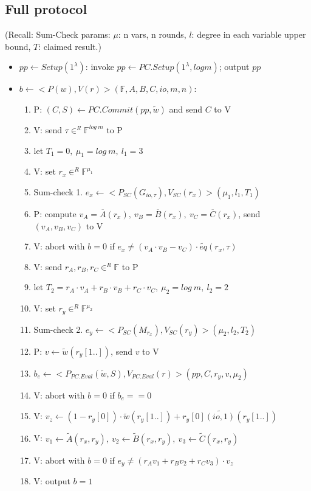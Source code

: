 \documentclass{article}
\theoremstyle{definition}
\begin{document}
\subsection{Full protocol}
\begin{footnotesize}
	(Recall: Sum-Check params: $\mu$: n vars, n rounds, $l$: degree in each variable upper bound, $T$: claimed result.)
\end{footnotesize}

\begin{itemize}
	\item $pp \leftarrow Setup(1^{\lambda})$: invoke $pp \leftarrow PC.Setup(1^{\lambda}, log m)$; output $pp$
	\item $b \leftarrow <P(w), V(r)>(\mathbb{F}, A,B,C, io, m, n)$:
	\begin{enumerate}
		\item P: $(C, S) \leftarrow PC.Commit(pp, \widetilde{w})$ and send $C$ to V
		\item V: send $\tau \in^R \mathbb{F}^{log~m}$ to P
		\item let $T_1=0,~ \mu_1=log~m,~ l_1=3$
		\item V: set $r_x \in^R \mathbb{F}^{\mu_1}$
		\item Sum-check 1. $e_x \leftarrow <P_{SC}(G_{io,\tau}), V_{SC}(r_x)>(\mu_1, l_1, T_1)$
		\item P: compute $v_A=\overline{A}(r_x),~ v_B=\overline{B}(r_x),~ v_C=\overline{C}(r_x)$, send $(v_A, v_B, v_C)$ to V
		\item V: abort with $b=0$ if $e_x \neq (v_A \cdot v_B - v_C)\cdot \widetilde{eq}(r_x, \tau)$
		\item V: send $r_A, r_B, r_C \in^R \mathbb{F}$ to P
		\item let $T_2 = r_A \cdot v_A + r_B \cdot v_B + r_C \cdot v_C,~ \mu_2=log~m,~ l_2=2$
		\item V: set $r_y \in^R \mathbb{F}^{\mu_2}$
		\item Sum-check 2. $e_y \leftarrow <P_{SC}(M_{r_x}), V_{SC}(r_y)>(\mu_2, l_2, T_2)$
		\item P: $v \leftarrow \widetilde{w}(r_y[1..])$, send $v$ to V
		\item $b_e \leftarrow <P_{PC.Eval}(\widetilde{w}, S), V_{PC.Eval}(r)>(pp,  C, r_y, v, \mu_2)$
		\item V: abort with $b=0$ if $b_e==0$
		\item V: $v_z \leftarrow (1 - r_y[0]) \cdot \widetilde{w}(r_y [1..]) + r_y[0] \widetilde{(io, 1)} (r_y[1..])$
		\item V: $v_1 \leftarrow \widetilde{A}(r_x, r_y),~ v_2 \leftarrow \widetilde{B}(r_x, r_y),~ v_3 \leftarrow \widetilde{C}(r_x, r_y)$
		\item V: abort with $b=0$ if $e_y \neq (r_A v_1 + r_B v_2 + r_C v_3) \cdot v_z$
		\item V: output $b=1$
	\end{enumerate}
\end{itemize}
\end{document}
